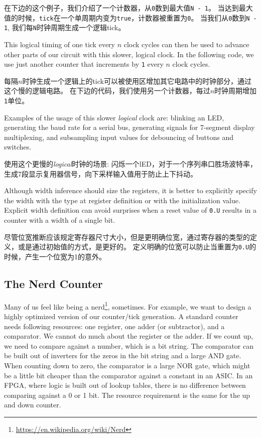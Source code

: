 \documentclass[%
    10pt,
    headinclude, footexclude,
    openright, %
    notitlepage,
    cleardoubleempty,
    headsepline,
    pointlessnumbers,
    bibtotoc, idxtotoc,
    ]{scrbook}
\newcommand{\code}[1]{{\small{\texttt{#1}}}}
\newcommand{\myref}[2]{\href{#1}{#2}}
\renewcommand{\myref}[2]{{#2}{\footnote{\url{#1}}}}
\begin{document}
在下边的这个例子，我们介绍了一个计数器，从\code{0}数到最大值\code{N - 1}。
当达到最大值的时候，\code{tick}在一个单周期内变为\code{true}，计数器被重置为\code{0}。
当我们从\code{0}数到\code{N - 1}, 我们每\code{N}时钟周期生成一个逻辑tick。



\noindent This logical timing of one tick every $n$ clock cycles can then be used
to advance other parts of our circuit with this slower, logical clock.
In the following code, we use just another counter that increments by \code{1}
every $n$ clock cycles.

\noindent 每隔$n$时钟生成一个逻辑上的tick可以被使用区增加其它电路中的时钟部分，通过这个慢的逻辑电路。
在下边的代码，我们使用另一个计数器，每过$n$时钟周期增加\code{1}单位。


Examples of the usage of this slower \emph{logical} clock are: blinking an LED,
generating the baud rate for a serial bus, generating signals for 7-segment
display multiplexing, and subsampling input values for debouncing of buttons
and switches. 

使用这个更慢的\emph{logical}时钟的场景: 闪烁一个lED，对于一个序列串口胜场波特率，
生成7段显示复用器信号，向下采样输入值用于防止上下抖动。

Although width inference should size the registers, it is better to explicitly
specify the width with the type at register definition or with the
initialization value. Explicit width definition can avoid surprises when a reset value of \code{0.U}
results in a counter with a width of a single bit.

尽管位宽推断应该规定寄存器尺寸大小，但是更明确位宽，通过寄存器的类型的定义，或是通过初始值的方式，是更好的。
定义明确的位宽可以防止当重置为\code{0.U}的时候，产生一个位宽为1的意外。

\subsection{The Nerd Counter}

Many of us feel like being a \myref{https://en.wikipedia.org/wiki/Nerd}{nerd}, sometimes.
For example, we want to design a highly optimized version of our counter/tick generation.
A standard counter needs following resources: one register, one adder (or subtractor),
and a comparator. We cannot do much about the register or the adder. If we count
up, we need to compare against a number, which is a bit string. The comparator
can be built out of inverters for the zeros in the bit string and a large AND gate.
When counting down to zero, the comparator is a large NOR gate, which might be
a little bit cheaper than the comparator against a constant in an ASIC.
In an FPGA, where logic is built out of lookup tables, there is no difference between comparing
against a 0 or 1 bit. The resource requirement is the same for the up and down counter.
\end{document}

